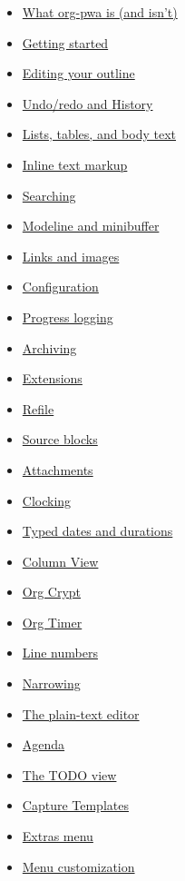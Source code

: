 \documentclass[11pt]{article}
\begin{document}
\begin{itemize}
\item \hyperref[sec:orge9fbe41]{What org-pwa is (and isn't)}
\item \hyperref[sec:org1897c34]{Getting started}
\item \hyperref[sec:org1979749]{Editing your outline}
\item \hyperref[sec:org82ca105]{Undo/redo and History}
\item \hyperref[sec:orgca29dff]{Lists, tables, and body text}
\item \hyperref[sec:org87db50b]{Inline text markup}
\item \hyperref[sec:org22ae446]{Searching}
\item \hyperref[sec:org87b300e]{Modeline and minibuffer}
\item \hyperref[sec:org9659c7e]{Links and images}
\item \hyperref[sec:orgc6e574d]{Configuration}
\item \hyperref[sec:orgfbb8a58]{Progress logging}
\item \hyperref[sec:orgf736f7c]{Archiving}
\item \hyperref[sec:orgd63a52b]{Extensions}
\item \hyperref[sec:orgf424d46]{Refile}
\item \hyperref[sec:org2fd54e4]{Source blocks}
\item \hyperref[sec:org970e59b]{Attachments}
\item \hyperref[sec:org6e1340d]{Clocking}
\item \hyperref[sec:org14be048]{Typed dates and durations}
\item \hyperref[sec:orgc54f9dd]{Column View}
\item \hyperref[sec:orgf01cffd]{Org Crypt}
\item \hyperref[sec:orge716ba5]{Org Timer}
\item \hyperref[sec:org31dd5c0]{Line numbers}
\item \hyperref[sec:org4bc1b50]{Narrowing}
\item \hyperref[sec:org0afb086]{The plain-text editor}
\item \hyperref[sec:org38ac5a3]{Agenda}
\item \hyperref[sec:org0699f8b]{The TODO view}
\item \hyperref[sec:org0116725]{Capture Templates}
\item \hyperref[sec:org147f9a0]{Extras menu}
\item \hyperref[sec:orgc0b0953]{Menu customization}

\end{itemize}
\end{document}
